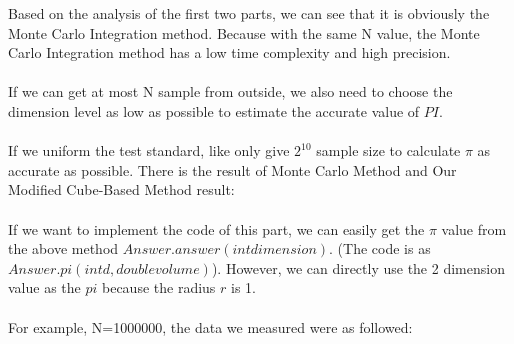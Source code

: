 \documentclass{article}
\begin{document}
		Based on the analysis of the first two parts, we can see that it is obviously the Monte Carlo Integration method. Because with the same N value, the Monte Carlo Integration method has a low time complexity and high precision. 
		\\
		\\
		If we can get at most N sample from outside, we also need to choose the dimension level as low as possible to estimate the accurate value of $PI$. 
		\\
		\\
		If we uniform the test standard, like only give $2^10$ sample size to calculate $\pi$ as accurate as possible. There is the result of Monte Carlo Method and Our Modified Cube-Based Method result:
		\\
		\\
		If we want to implement the code of this part, we can easily get the $\pi$ value from the above method $Answer.answer(int dimension)$. (The code is as $Answer.pi(int d, double volume)$). However, we can directly use the 2 dimension value as the $pi$ because the radius $r$ is 1.
		\\
		\\
		For example, N=1000000, the data we measured were as followed:
		\\
\end{document}
